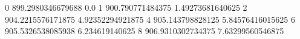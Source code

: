0 899.2980346679688 0.0
1 900.790771484375 1.49273681640625
2 904.2215576171875 4.92352294921875
4 905.143798828125 5.84576416015625
6 905.5326538085938 6.234619140625
8 906.9310302734375 7.63299560546875
